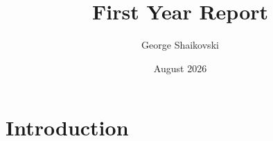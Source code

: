 \documentclass{article}
\title{First Year Report}
\author{George Shaikovski}
\date{August 2026}
\begin{document}
\maketitle

\section{Introduction}
\end{document}
